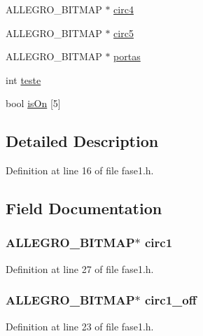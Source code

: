 \begin{DoxyCompactItemize}
A\-L\-L\-E\-G\-R\-O\-\_\-\-B\-I\-T\-M\-A\-P $\ast$ \hyperlink{struct_level_one_a1adf43c25b4c9b87aeb45c1e4bd24d4f}{circ4}
\item 
A\-L\-L\-E\-G\-R\-O\-\_\-\-B\-I\-T\-M\-A\-P $\ast$ \hyperlink{struct_level_one_a6444f15bb917b382f7e91576f46c2706}{circ5}
\item 
A\-L\-L\-E\-G\-R\-O\-\_\-\-B\-I\-T\-M\-A\-P $\ast$ \hyperlink{struct_level_one_a6c47128335a6e9846fb9576bace5a597}{portas}
\item 
int \hyperlink{struct_level_one_a71237b18c216e02629593b1969cff245}{teste}
\item 
bool \hyperlink{struct_level_one_a59f6fe985ed5513f62660b2926c812aa}{is\-On} \mbox{[}5\mbox{]}
\end{DoxyCompactItemize}


\subsection{Detailed Description}


Definition at line 16 of file fase1.\-h.



\subsection{Field Documentation}
\hypertarget{struct_level_one_a9877f31790b6d2f38fb468a9448223f1}{
\subsubsection[{circ1}]{\setlength{\rightskip}{0pt plus 5cm}A\-L\-L\-E\-G\-R\-O\-\_\-\-B\-I\-T\-M\-A\-P$\ast$ circ1}}\label{struct_level_one_a9877f31790b6d2f38fb468a9448223f1}


Definition at line 27 of file fase1.\-h.

\hypertarget{struct_level_one_a61973bafd11ab9dea9306731297f4728}{
\subsubsection[{circ1\-\_\-off}]{\setlength{\rightskip}{0pt plus 5cm}A\-L\-L\-E\-G\-R\-O\-\_\-\-B\-I\-T\-M\-A\-P$\ast$ circ1\-\_\-off}}\label{struct_level_one_a61973bafd11ab9dea9306731297f4728}


Definition at line 23 of file fase1.\-h.

